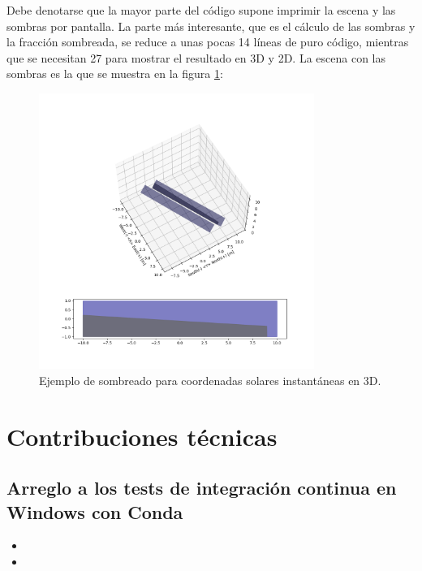 Debe denotarse que la mayor parte del código supone imprimir la escena y las sombras por pantalla. La parte más interesante, que es el cálculo de las sombras y la fracción sombreada, se reduce a unas pocas 14 líneas de puro código, mientras que se necesitan 27 para mostrar el resultado en 3D y 2D. La escena con las sombras es la que se muestra en la figura \ref{fig:sombreado_3d}:

\begin{figure}[H]
    \centering
    \includegraphics[width=0.8\textwidth]{./images/shading_3d/sphx_glr_plot_spatial_row_to_row_shading_001.png}
    \caption{Ejemplo de sombreado para coordenadas solares instantáneas en 3D.}
    \label{fig:sombreado_3d}
\end{figure}

\section{Contribuciones técnicas} \label{sct:desarrollo:contribuciones_tecnicas}

\subsection{Arreglo a los tests de integración continua en Windows con Conda}

\begin{itemize}
    \item {}
    \item {}
\end{itemize}

